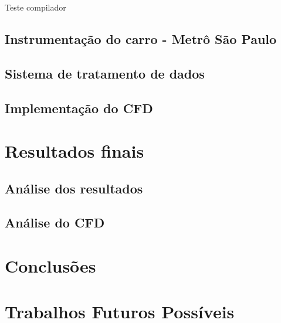 \documentclass[acronym,symbols]{fei}
\begin{document}
Teste compilador

\section{Instrumentação do carro - Metrô São Paulo}

\section{Sistema de tratamento de dados}

\section{Implementação do CFD}

\chapter{Resultados finais}

\section{Análise dos resultados}

\section{Análise do CFD}

\chapter{Conclusões}

\chapter{Trabalhos Futuros Possíveis}

\printbibliography
\end{document}
